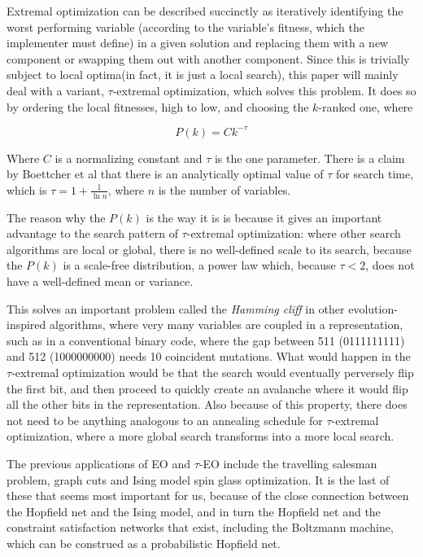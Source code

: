 \documentclass[12pt]{article}
\begin{document}
Extremal optimization can be described succinctly as iteratively identifying the worst performing variable (according to the variable's fitness, which the implementer must define) in a given solution and replacing them with a new component or swapping them out with another component. Since this is trivially subject to local optima(in fact, it is just a local search), this paper will mainly deal with a variant, $\tau$-extremal optimization, which solves this problem. It does so by ordering the local fitnesses, high to low, and choosing the $k$-ranked one, where

$$P(k) = Ck^{-\tau}$$

Where $C$ is a normalizing constant and $\tau$ is the one parameter. There is a claim by Boettcher et al that there is an analytically optimal value of $\tau$ for search time, which is $\tau = 1 + \frac{1}{\ln n}$, where $n$ is the number of variables.%

The reason why the $P(k)$ is the way it is is because it gives an important advantage to the search pattern of $\tau$-extremal optimization: where other search algorithms are local or global, there is no well-defined scale to its search, because the $P(k)$ is a scale-free distribution, a power law which, because $\tau < 2$, does not have a well-defined mean or variance.

This solves an important problem called the \emph{Hamming cliff} in other evolution-inspired algorithms, where very many variables are coupled in a representation, such as in a conventional binary code, where the gap between 511 (0111111111) and 512 (1000000000) needs 10 coincident mutations. What would happen in the $\tau$-extremal optimization would be that the search would eventually perversely flip the first bit, and then proceed to quickly create an avalanche where it would flip all the other bits in the representation. Also because of this property, there does not need to be anything analogous to an annealing schedule for $\tau$-extremal optimization, where a more global search transforms into a more local search.

The previous applications of EO and $\tau$-EO include the travelling salesman problem, graph cuts and Ising model spin glass optimization. It is the last of these that seems most important for us, because of the close connection between the Hopfield net and the Ising model, and in turn the Hopfield net and the constraint satisfaction networks that exist, including the Boltzmann machine, which can be construed as a probabilistic Hopfield net.
\end{document}
